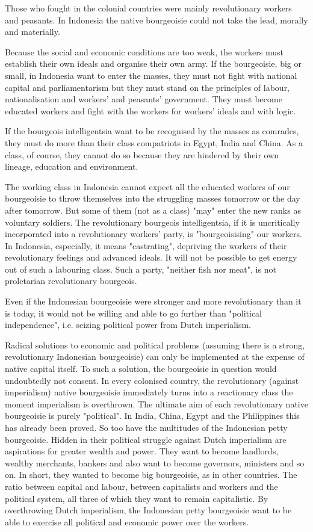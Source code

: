 Those who fought in the colonial countries were mainly revolutionary workers and peasants. In Indonesia the native bourgeoisie could not take the lead, morally and materially.\nline

Because the social and economic conditions are too weak, the workers must establish their own ideals and organise their own army. 
If the bourgeoisie, big or small, in Indonesia want to enter the masses, they must not fight with national capital and parliamentarism but 
they must stand on the principles of labour, nationalisation and workers' and peasants' government. They must become educated workers and 
fight with the workers for workers' ideals and with logic.\nline

If the bourgeois intelligentsia want to be recognised by the masses as comrades, they must do more than their class compatriots in Egypt, India and China.
As a class, of course, they cannot do so because they are hindered by their own lineage, education and environment.\nline

The working class in Indonesia cannot expect all the educated workers of our bourgeoisie to throw themselves into the struggling masses 
tomorrow or the day after tomorrow. But some of them (not as a class) "may" enter the new ranks as voluntary soldiers. The revolutionary 
bourgeois intelligentsia, if it is uncritically incorporated into a revolutionary workers' party, is "bourgeoisising" our workers. 
In Indonesia, especially, it means "castrating", depriving the workers of their revolutionary feelings and advanced ideals. 
It will not be possible to get energy out of such a labouring class. Such a party, "neither fish nor meat", is not proletarian revolutionary bourgeois.\nline

Even if the Indonesian bourgeoisie were stronger and more revolutionary than it is today, it would not be willing and able to go further than "political independence", i.e. seizing political power from Dutch imperialism.\nline

Radical solutions to economic and political problems (assuming there is a strong, revolutionary Indonesian bourgeoisie) can only be 
implemented at the expense of native capital itself. To such a solution, the bourgeoisie in question would undoubtedly not consent. 
In every colonised country, the revolutionary (against imperialism) native bourgeoisie immediately turns into a reactionary class the 
moment imperialism is overthrown. The ultimate aim of each revolutionary native bourgeoisie is purely "political". In India, China, Egypt 
and the Philippines this has already been proved. So too have the multitudes of the Indonesian petty bourgeoisie. Hidden in their political 
struggle against Dutch imperialism are aspirations for greater wealth and power. They want to become landlords, wealthy merchants, bankers 
and also want to become governors, ministers and so on. In short, they wanted to become big bourgeoisie, as in other countries. 
The ratio between capital and labour, between capitalists and workers and the political system, all three of which they want to 
remain capitalistic. By overthrowing Dutch imperialism, the Indonesian petty bourgeoisie want to be able to exercise all political and 
economic power over the workers.\nline

